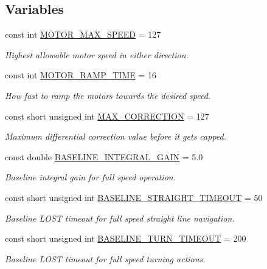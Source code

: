\subsection*{Variables}
\begin{DoxyCompactItemize}
\item 
const int \hyperlink{namespaceIDP_a4ead0b21ad2c507b542445695182d4cd}{MOTOR\_\-MAX\_\-SPEED} = 127
\begin{DoxyCompactList}\small\item\em Highest allowable motor speed in either direction. \item\end{DoxyCompactList}\item 
const int \hyperlink{namespaceIDP_ab3a00a6cc8a6dba271e38d337daf4703}{MOTOR\_\-RAMP\_\-TIME} = 16
\begin{DoxyCompactList}\small\item\em How fast to ramp the motors towards the desired speed. \item\end{DoxyCompactList}\item 
const short unsigned int \hyperlink{namespaceIDP_a246919caaacabcb0399802d542d8330b}{MAX\_\-CORRECTION} = 127
\begin{DoxyCompactList}\small\item\em Maximum differential correction value before it gets capped. \item\end{DoxyCompactList}\item 
const double \hyperlink{namespaceIDP_a13d57d0e366139689356754d049ca38b}{BASELINE\_\-INTEGRAL\_\-GAIN} = 5.0
\begin{DoxyCompactList}\small\item\em Baseline integral gain for full speed operation. \item\end{DoxyCompactList}\item 
const short unsigned int \hyperlink{namespaceIDP_ad49ae86fe58241291415f56ea64c8ac8}{BASELINE\_\-STRAIGHT\_\-TIMEOUT} = 50
\begin{DoxyCompactList}\small\item\em Baseline LOST timeout for full speed straight line navigation. \item\end{DoxyCompactList}\item 
const short unsigned int \hyperlink{namespaceIDP_ad315440c84ff5573297a088ffafc1b92}{BASELINE\_\-TURN\_\-TIMEOUT} = 200
\begin{DoxyCompactList}\small\item\em Baseline LOST timeout for full speed turning actions. \item\end{DoxyCompactList}\item 

\end{DoxyCompactItemize}
